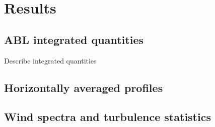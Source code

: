 \section{Results}

\subsection{ABL integrated quantities}
Describe integrated quantities

\subsection{Horizontally averaged profiles}

\subsection{Wind spectra and turbulence statistics}



